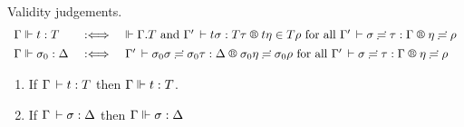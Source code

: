 \documentclass[acmlarge,review,anonymous]{acmart}\settopmatter{printfolios=true}
\begin{document}
Validity judgements.
\[
\begin{array}{l@{\quad}l@{\quad}l}
  \Gamma \valid t : T & \defas & %
    \valid \cext \Gamma T \mand
    \LR {\Gamma'} {t \sigma} {T \tau} {t \eta} {T \rho}
    \mforall \LRSub {\Gamma'} \sigma \tau \Gamma \eta \rho
\\[1ex]
  \Gamma \valid \sigma_0 : \Delta & \defas &
    \LRSub {\Gamma'} {\sigma_0 \sigma} {\sigma_0 \tau} \Delta {\sigma_0 \eta} {\sigma_0 \rho}
    \mforall \LRSub {\Gamma'} {\sigma} {\tau} \Gamma {\eta} {\rho}
\end{array}
\]

\begin{theorem}
\label{thm:fundty}
\bla
\begin{enumerate}
\item
If\/ $\Gamma \,\vdash t : T$ then $\Gamma \Vdash t : T$.
\item
If\/ $\Gamma \,\vdash \sigma : \Delta$ then
$\Gamma \Vdash \sigma : \Delta$
\end{enumerate}
\end{theorem}
\end{document}
